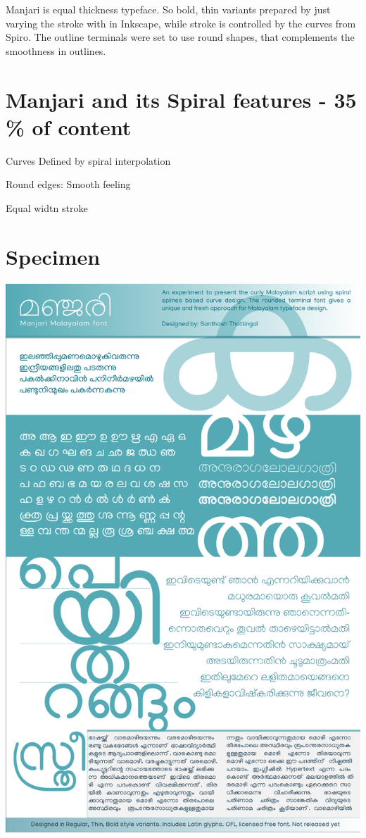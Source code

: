 \documentclass[10pt]{article}
\begin{document}
Manjari is equal thickness typeface. So bold, thin variants prepared by just varying the stroke with in Inkscape, while stroke is controlled by the curves from Spiro. The outline terminals were set to use round shapes, that complements the smoothness in outlines.

\section{Manjari and its Spiral features - 35 \% of content}

Curves Defined by spiral interpolation

Round edges: Smooth feeling

Equal widtn stroke

\newpage

\section{Specimen}

\includegraphics[width=\textwidth]{images/Manjari-Specimen.pdf}
\end{document}
